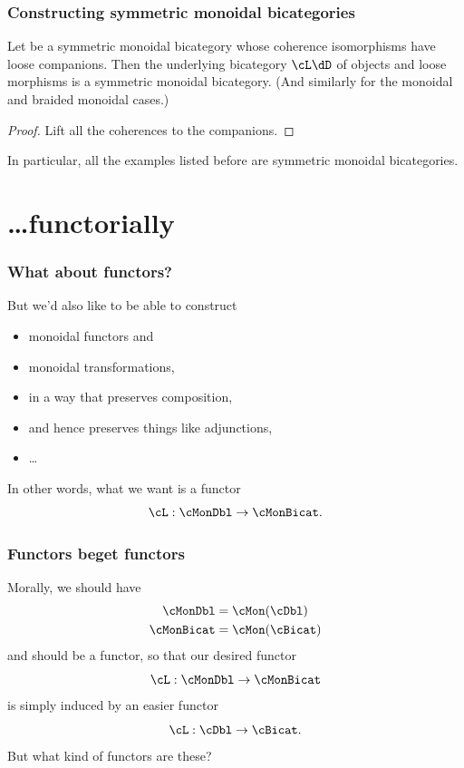 \documentclass{beamer}
\begin{document}
\begin{frame}
  \frametitle{Constructing symmetric monoidal bicategories}
  \begin{theorem}[S., 2010]
    Let \dD be a symmetric monoidal bicategory whose coherence isomorphisms have loose companions.
    Then the underlying bicategory $\cL\dD$ of objects and loose morphisms is a symmetric monoidal bicategory.
    (And similarly for the monoidal and braided monoidal cases.)
  \end{theorem}
  \begin{proof}
    Lift all the coherences to the companions.
  \end{proof}
  In particular, all the examples listed before are symmetric monoidal bicategories.
\end{frame}

\section{\dots functorially}

\begin{frame}
  \frametitle{What about functors?}
  But we'd also like to be able to construct
  \begin{itemize}
  \item monoidal functors and
  \item monoidal transformations, 
  \item in a way that preserves composition,
  \item and hence preserves things like adjunctions,
  \item \dots
  \end{itemize}
  In other words, what we want is a \alert{functor}
  \[\cL : \cMonDbl \to \cMonBicat .\]
\end{frame}

\begin{frame}
  \frametitle{Functors beget functors}
  Morally, we should have
  \begin{align*}
    \cMonDbl &= \cMon(\cDbl) \\
    \cMonBicat &= \cMon(\cBicat)
  \end{align*}
  and \cMon should be a functor, so that our desired functor
  \[\cL : \cMonDbl \to \cMonBicat \]
  is simply induced by an easier functor
  \[ \cL : \cDbl \to \cBicat. \]
  But \alert{what kind of functors are these?}
\end{frame}
\end{document}
